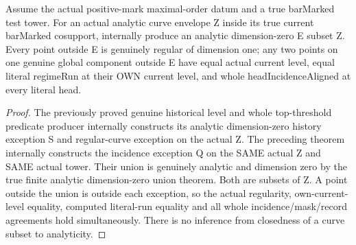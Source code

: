 \begin{theorem}
\label{hir:member-head-incidence-full-history-exception}
\leanok
{}
Assume the actual positive-mark maximal-order datum and a true barMarked
test tower. For an actual analytic curve envelope Z inside its true current
barMarked cosupport, internally produce an analytic dimension-zero E subset
Z. Every point outside E is genuinely regular of dimension one; any two
points on one genuine global component outside E have equal actual current
level, equal literal regimeRun at their OWN current level, and whole
headIncidenceAligned at every literal head.
\end{theorem}
\begin{proof}
The previously proved genuine historical level and whole top-threshold
predicate producer internally constructs its analytic dimension-zero
history exception S and regular-curve exception on the actual Z. The
preceding theorem internally constructs the incidence exception Q on the
SAME actual Z and SAME actual tower. Their union is genuinely analytic and
dimension zero by the true finite analytic dimension-zero union theorem.
Both are subsets of Z. A point outside the union is outside each exception,
so the actual regularity, own-current-level equality, computed literal-run
equality and all whole incidence/mask/record agreements hold simultaneously.
There is no inference from closedness of a curve subset to analyticity.
\end{proof}

